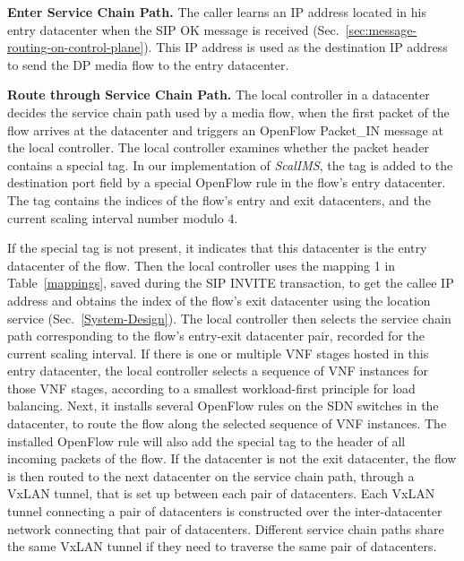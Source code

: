 \vspace{1mm}
\noindent\textbf{Enter Service Chain Path.}
The caller learns an IP address located in his entry datacenter %
when the SIP OK message is received (Sec.~\ref{sec:message-routing-on-control-plane}). This IP address is used as the destination IP address to send the DP media flow to the entry datacenter. %

\noindent\textbf{Route through Service Chain Path.}
The local controller in a datacenter decides the service chain path used by a media flow, when the first packet of the flow arrives at the datacenter and triggers an OpenFlow Packet\_IN message at the local controller. The local controller examines whether the packet header contains a special tag. In our implementation of \textit{ScalIMS}, the tag is added to the destination port field by a special OpenFlow rule in the flow's entry datacenter. The tag contains the indices of the flow's entry and exit datacenters, and the current scaling interval number modulo 4. %

If the special tag is not present, it indicates that %
 this datacenter is the entry datacenter of the flow. Then the local controller uses the mapping 1 in Table~\ref{mappings}, saved during the SIP INVITE transaction, to get the callee IP address %
 and obtains the index of the flow's exit datacenter using the location service (Sec.~\ref{System-Design}). The local controller then selects the service chain path corresponding to the flow's entry-exit datacenter pair, recorded for the current scaling interval.  %
 If there is one or multiple VNF stages hosted in this entry datacenter, the local controller selects a sequence of VNF instances for those VNF stages, according to a smallest workload-first principle for load balancing. Next, it installs several OpenFlow rules on the SDN switches in the datacenter, to route the flow along the selected sequence of VNF instances. The installed OpenFlow rule will also add the special tag to the header of all incoming packets of the flow. %
 If the datacenter is not the exit datacenter, the flow is then routed to the next datacenter on the service chain path, through a VxLAN tunnel, that is set up between each pair of datacenters. Each VxLAN tunnel connecting a pair of datacenters is constructed over the inter-datacenter network connecting that pair of datacenters. Different service chain paths share the same VxLAN tunnel if they need to traverse the same pair of datacenters.


